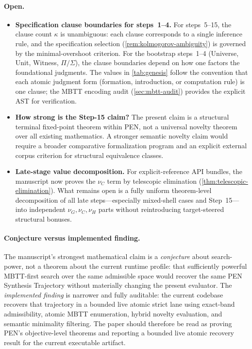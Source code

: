 \documentclass[11pt,a4paper]{article}
\theoremstyle{plain}
\theoremstyle{definition}
\theoremstyle{remark}
\begin{document}
\paragraph{Open.}
\begin{itemize}[nosep]
    \item \textbf{Specification clause boundaries for steps~1--4.}
    For steps~5--15, the clause count $\kappa$ is unambiguous: each clause corresponds to a single inference rule, and the specification selection (\cref{rem:kolmogorov-ambiguity}) is governed by the minimal-overshoot criterion.
    For the bootstrap steps~1--4 (Universe, Unit, Witness, $\Pi/\Sigma$), the clause boundaries depend on how one factors the foundational judgments.
    The values in \cref{tab:genesis} follow the convention that each atomic judgment form (formation, introduction, or computation rule) is one clause; the MBTT encoding audit (\cref{sec:mbtt-audit}) provides the explicit AST for verification.
    \item \textbf{How strong is the Step-15 claim?}
    The present claim is a structural terminal fixed-point theorem within PEN, not a universal novelty theorem over all existing mathematics.
    A stronger semantic novelty claim would require a broader comparative formalization program and an explicit external corpus criterion for structural equivalence classes.
    \item \textbf{Late-stage value decomposition.}
    For explicit-reference API bundles, the manuscript now proves the $\nu_C$ term by telescopic elimination (\cref{thm:telescopic-elimination}).
    What remains open is a fully uniform theorem-level decomposition of all late steps---especially mixed-shell cases and Step~15---into independent $\nu_G,\nu_C,\nu_H$ parts without reintroducing target-steered structural bonuses.
\end{itemize}

\paragraph{Conjecture versus implemented finding.}
The manuscript's strongest mathematical claim is a \emph{conjecture} about search-power, not a theorem about the current runtime profile: that sufficiently powerful MBTT-first search over the same admissible space would recover the same PEN Synthesis Trajectory without materially changing the present evaluator.
The \emph{implemented finding} is narrower and fully auditable: the current codebase recovers that trajectory in a bounded live atomic strict lane using exact-band admissibility, atomic MBTT enumeration, hybrid novelty evaluation, and semantic minimality filtering.
The paper should therefore be read as proving PEN's objective-level theorems and reporting a bounded live atomic recovery result for the current executable artifact.
\end{document}
